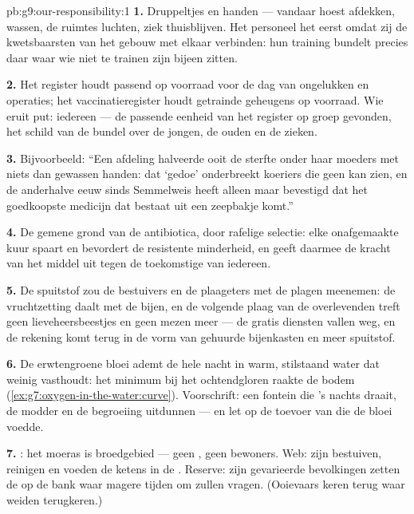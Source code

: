 \begin{solution}{pb:g9:our-responsibility:1}
\textbf{1.} Druppeltjes en handen --- vandaar hoest afdekken,
wassen, de ruimtes luchten, ziek thuisblijven. Het personeel het
eerst omdat zij de kwetsbaarsten van het gebouw met elkaar
verbinden: hun training bundelt precies daar waar wie niet te
trainen zijn bijeen zitten.

\textbf{2.} Het register houdt passend  op voorraad voor de
dag van ongelukken en operaties; het vaccinatieregister houdt
getrainde geheugens op voorraad. Wie eruit put: iedereen --- de
passende eenheid van het register op groep gevonden, het schild van
de bundel over de jongen, de ouden en de zieken.

\textbf{3.} Bijvoorbeeld: ``Een afdeling halveerde ooit de sterfte
onder haar moeders met niets dan gewassen handen: dat
`gedoe' onderbreekt koeriers die geen  kan zien, en de anderhalve eeuw
sinds Semmelweis heeft alleen maar bevestigd dat het goedkoopste
medicijn dat bestaat uit een zeepbakje komt.''

\textbf{4.} De gemene grond van de antibiotica, door rafelige
selectie: elke onafgemaakte kuur spaart en bevordert de resistente
minderheid, en geeft daarmee de kracht van het middel uit tegen de
toekomstige  van iedereen.

\textbf{5.} De spuitstof zou de bestuivers en de plaageters met de
plagen meenemen: de vruchtzetting daalt met de bijen, en de
volgende plaag van de overlevenden treft geen lieveheersbeestjes en
geen mezen meer --- de gratis diensten vallen weg, en de rekening
komt terug in de vorm van gehuurde bijenkasten en meer spuitstof.

\textbf{6.} De erwtengroene bloei ademt de hele nacht in warm,
stilstaand water dat weinig  vasthoudt: het minimum bij het
ochtendgloren raakte de bodem
(\cref{ex:g7:oxygen-in-the-water:curve}). Voorschrift: een fontein
die 's nachts draait, de modder en de begroeiing uitdunnen --- en
let op de toevoer van  die de bloei voedde.

\textbf{7.} : het moeras is broedgebied --- geen
, geen bewoners. Web: zijn  bestuiven, reinigen
en voeden de ketens in de . Reserve: zijn gevarieerde
bevolkingen zetten de  op de bank waar magere tijden om
zullen vragen. (Ooievaars keren terug waar weiden terugkeren.)


\end{solution}
